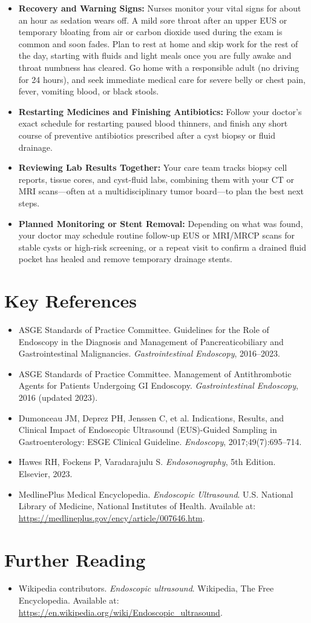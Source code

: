 \begin{itemize}
    \item \textbf{Recovery and Warning Signs:} Nurses monitor your vital signs for about an hour as sedation wears off. A mild sore throat after an upper EUS or temporary bloating from air or carbon dioxide used during the exam is common and soon fades. Plan to rest at home and skip work for the rest of the day, starting with fluids and light meals once you are fully awake and throat numbness has cleared. Go home with a responsible adult (no driving for 24 hours), and seek immediate medical care for severe belly or chest pain, fever, vomiting blood, or black stools.
    \item \textbf{Restarting Medicines and Finishing Antibiotics:} Follow your doctor's exact schedule for restarting paused blood thinners, and finish any short course of preventive antibiotics prescribed after a cyst biopsy or fluid drainage.
    \item \textbf{Reviewing Lab Results Together:} Your care team tracks biopsy cell reports, tissue cores, and cyst-fluid labs, combining them with your CT or MRI scans---often at a multidisciplinary tumor board---to plan the best next steps.
    \item \textbf{Planned Monitoring or Stent Removal:} Depending on what was found, your doctor may schedule routine follow-up EUS or MRI/MRCP scans for stable cysts or high-risk screening, or a repeat visit to confirm a drained fluid pocket has healed and remove temporary drainage stents.
\end{itemize}

\section{Key References}

\begin{itemize}
    \item ASGE Standards of Practice Committee. Guidelines for the Role of Endoscopy in the Diagnosis and Management of Pancreaticobiliary and Gastrointestinal Malignancies. \textit{Gastrointestinal Endoscopy}, 2016--2023.
    \item ASGE Standards of Practice Committee. Management of Antithrombotic Agents for Patients Undergoing GI Endoscopy. \textit{Gastrointestinal Endoscopy}, 2016 (updated 2023).
    \item Dumonceau JM, Deprez PH, Jenssen C, et al. Indications, Results, and Clinical Impact of Endoscopic Ultrasound (EUS)-Guided Sampling in Gastroenterology: ESGE Clinical Guideline. \textit{Endoscopy}, 2017;49(7):695--714.
    \item Hawes RH, Fockens P, Varadarajulu S. \textit{Endosonography}, 5th Edition. Elsevier, 2023.
    \item MedlinePlus Medical Encyclopedia. \textit{Endoscopic Ultrasound}. U.S. National Library of Medicine, National Institutes of Health. Available at: \url{https://medlineplus.gov/ency/article/007646.htm}.
\end{itemize}

\section{Further Reading}
\begin{itemize}
  \item Wikipedia contributors. \textit{Endoscopic ultrasound}. Wikipedia, The Free Encyclopedia. Available at: \url{https://en.wikipedia.org/wiki/Endoscopic_ultrasound}.
\end{itemize}
